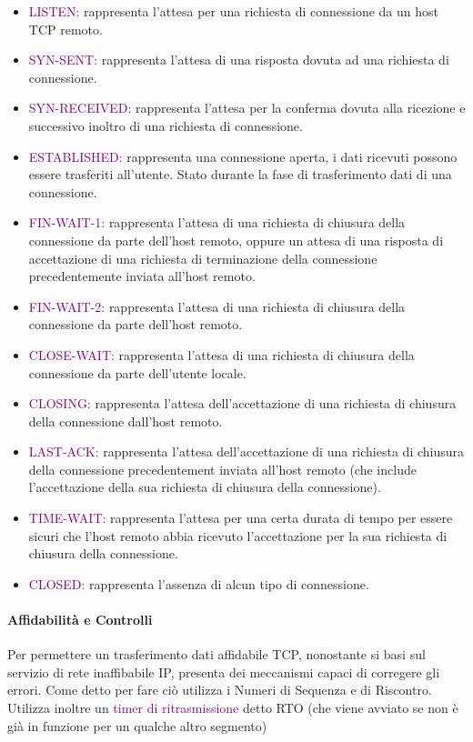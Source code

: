 \begin{itemize}
    \item \textcolor{purple}{LISTEN:} rappresenta l'attesa per una richiesta di connessione da un host TCP remoto.
    \item \textcolor{purple}{SYN-SENT:} rappresenta l'attesa di una risposta dovuta ad una richiesta di connessione.
    \item \textcolor{purple}{SYN-RECEIVED:} rappresenta l'attesa per la conferma dovuta alla ricezione e successivo inoltro di una richiesta di connessione.
    \item \textcolor{purple}{ESTABLISHED:} rappresenta una connessione aperta, i dati ricevuti possono essere trasferiti all'utente. Stato durante la fase di trasferimento dati di una connessione.
    \item \textcolor{purple}{FIN-WAIT-1:} rappresenta l'attesa di una richiesta di chiusura della connessione da parte dell'host remoto, oppure un attesa di una risposta di accettazione di una richiesta di terminazione della connessione precedentemente inviata all'host remoto.
    \item \textcolor{purple}{FIN-WAIT-2:} rappresenta l'attesa di una richiesta di chiusura della connessione da parte dell'host remoto.
    \item \textcolor{purple}{CLOSE-WAIT:} rappresenta l'attesa di una richiesta di chiusura della connessione da parte dell'utente locale.
    \item \textcolor{purple}{CLOSING:} rappresenta l'attesa dell'accettazione di una richiesta di chiusura della connessione dall'host remoto.
    \item \textcolor{purple}{LAST-ACK:} rappresenta l'attesa dell'accettazione di una richiesta di chiusura della connessione precedentement inviata all'host remoto (che include l'accettazione della sua richiesta di chiusura della connessione).
    \item \textcolor{purple}{TIME-WAIT:} rappresenta l'attesa per una certa durata di tempo per essere sicuri che l'host remoto abbia ricevuto l'accettazione per la sua richiesta di chiusura della connessione.
    \item \textcolor{purple}{CLOSED:} rappresenta l'assenza di alcun tipo di connessione.
\end{itemize}

\paragraph{Affidabilità e Controlli}
Per permettere un trasferimento dati affidabile TCP, nonostante si basi sul servizio di rete inaffibabile IP, presenta dei meccanismi capaci di corregere gli errori. 
Come detto per fare ciò utilizza i Numeri di Sequenza e di Riscontro.
Utilizza inoltre un \textcolor{purple}{timer di ritrasmissione} detto RTO (che viene avviato se non è già in funzione per un qualche altro segmento)

